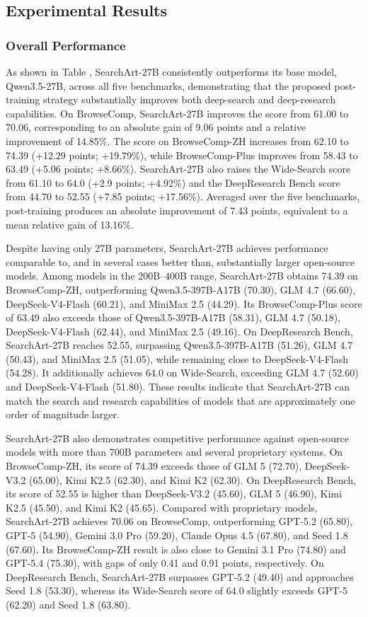 \documentclass{huawei}
\begin{document}
\subsection{Experimental Results}
\subsubsection{Overall Performance}
As shown in Table , SearchArt-27B consistently outperforms its base model, Qwen3.5-27B, across all five benchmarks, demonstrating that the proposed post-training strategy substantially improves both deep-search and deep-research capabilities. On BrowseComp, SearchArt-27B improves the score from 61.00 to 70.06, corresponding to an absolute gain of 9.06 points and a relative improvement of 14.85\%. The score on BrowseComp-ZH increases from 62.10 to 74.39 (+12.29 points; +19.79\%), while BrowseComp-Plus improves from 58.43 to 63.49 (+5.06 points; +8.66\%). SearchArt-27B also raises the Wide-Search score from 61.10 to 64.0 (+2.9 points; +4.92\%) and the DeepResearch Bench score from 44.70 to 52.55 (+7.85 points; +17.56\%). Averaged over the five benchmarks, post-training produces an absolute improvement of 7.43 points, equivalent to a mean relative gain of 13.16\%.


Despite having only 27B parameters, SearchArt-27B achieves performance comparable to, and in several cases better than, substantially larger open-source models. Among models in the 200B–400B range, SearchArt-27B obtains 74.39 on BrowseComp-ZH, outperforming Qwen3.5-397B-A17B (70.30), GLM 4.7 (66.60), DeepSeek-V4-Flash (60.21), and MiniMax 2.5 (44.29). Its BrowseComp-Plus score of 63.49 also exceeds those of Qwen3.5-397B-A17B (58.31), GLM 4.7 (50.18), DeepSeek-V4-Flash (62.44), and MiniMax 2.5 (49.16). On DeepResearch Bench, SearchArt-27B reaches 52.55, surpassing Qwen3.5-397B-A17B (51.26), GLM 4.7 (50.43), and MiniMax 2.5 (51.05), while remaining close to DeepSeek-V4-Flash (54.28). It additionally achieves 64.0 on Wide-Search, exceeding GLM 4.7 (52.60) and DeepSeek-V4-Flash (51.80). These results indicate that SearchArt-27B can match the search and research capabilities of models that are approximately one order of magnitude larger.


SearchArt-27B also demonstrates competitive performance against open-source models with more than 700B parameters and several proprietary systems. On BrowseComp-ZH, its score of 74.39 exceeds those of GLM 5 (72.70), DeepSeek-V3.2 (65.00), Kimi K2.5 (62.30), and Kimi K2 (62.30). On DeepResearch Bench, its score of 52.55 is higher than DeepSeek-V3.2 (45.60), GLM 5 (46.90), Kimi K2.5 (45.50), and Kimi K2 (45.65). Compared with proprietary models, SearchArt-27B achieves 70.06 on BrowseComp, outperforming GPT-5.2 (65.80), GPT-5 (54.90), Gemini 3.0 Pro (59.20), Claude Opus 4.5 (67.80), and Seed 1.8 (67.60). Its BrowseComp-ZH result is also close to Gemini 3.1 Pro (74.80) and GPT-5.4 (75.30), with gaps of only 0.41 and 0.91 points, respectively. On DeepResearch Bench, SearchArt-27B surpasses GPT-5.2 (49.40) and approaches Seed 1.8 (53.30), whereas its Wide-Search score of 64.0 slightly exceeds GPT-5 (62.20) and Seed 1.8 (63.80).
\end{document}
